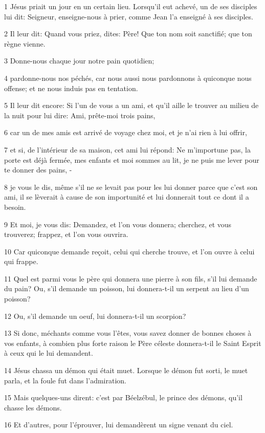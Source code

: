 \par 1 Jésus priait un jour en un certain lieu. Lorsqu'il eut achevé, un de ses disciples lui dit: Seigneur, enseigne-nous à prier, comme Jean l'a enseigné à ses disciples.
\par 2 Il leur dit: Quand vous priez, dites: Père! Que ton nom soit sanctifié; que ton règne vienne.
\par 3 Donne-nous chaque jour notre pain quotidien;
\par 4 pardonne-nous nos péchés, car nous aussi nous pardonnons à quiconque nous offense; et ne nous induis pas en tentation.
\par 5 Il leur dit encore: Si l'un de vous a un ami, et qu'il aille le trouver au milieu de la nuit pour lui dire: Ami, prête-moi trois pains,
\par 6 car un de mes amis est arrivé de voyage chez moi, et je n'ai rien à lui offrir,
\par 7 et si, de l'intérieur de sa maison, cet ami lui répond: Ne m'importune pas, la porte est déjà fermée, mes enfants et moi sommes au lit, je ne puis me lever pour te donner des pains, -
\par 8 je vous le dis, même s'il ne se levait pas pour les lui donner parce que c'est son ami, il se lèverait à cause de son importunité et lui donnerait tout ce dont il a besoin.
\par 9 Et moi, je vous dis: Demandez, et l'on vous donnera; cherchez, et vous trouverez; frappez, et l'on vous ouvrira.
\par 10 Car quiconque demande reçoit, celui qui cherche trouve, et l'on ouvre à celui qui frappe.
\par 11 Quel est parmi vous le père qui donnera une pierre à son fils, s'il lui demande du pain? Ou, s'il demande un poisson, lui donnera-t-il un serpent au lieu d'un poisson?
\par 12 Ou, s'il demande un oeuf, lui donnera-t-il un scorpion?
\par 13 Si donc, méchants comme vous l'êtes, vous savez donner de bonnes choses à vos enfants, à combien plus forte raison le Père céleste donnera-t-il le Saint Esprit à ceux qui le lui demandent.
\par 14 Jésus chassa un démon qui était muet. Lorsque le démon fut sorti, le muet parla, et la foule fut dans l'admiration.
\par 15 Mais quelques-uns dirent: c'est par Béelzébul, le prince des démons, qu'il chasse les démons.
\par 16 Et d'autres, pour l'éprouver, lui demandèrent un signe venant du ciel.
